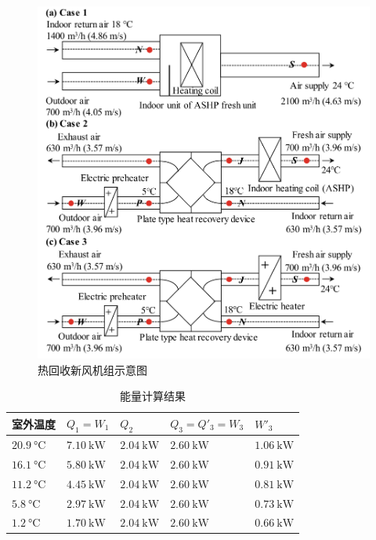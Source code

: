 \begin{figure}
	\centering
	\includegraphics[width=\textwidth]{figure/figure_11}
	\caption{热回收新风机组示意图}
	\label{F:11}
\end{figure}

\begin{table}[ht]
\centering	
\caption{能量计算结果}
\begin{tabular}{@{}lllll@{}}
	\toprule
	室外温度 & $Q_1 = W_1$ & $Q_2$ & $Q_3=Q'_3=W_3$ & $W'_3$ \\ \midrule
	$\qty{20.9}{\degreeCelsius} $ & $\qty{7.10}{\kW} $ & $\qty{2.04}{\kW} $ & $\qty{2.60}{\kW} $ & $\qty{1.06}{\kW} $ \\
	$\qty{16.1}{\degreeCelsius} $ & $\qty{5.80}{\kW} $ & $\qty{2.04}{\kW} $ & $\qty{2.60}{\kW} $ & $\qty{0.91}{\kW} $ \\
	$\qty{11.2}{\degreeCelsius} $ & $\qty{4.45}{\kW} $ & $\qty{2.04}{\kW} $ & $\qty{2.60}{\kW} $ & $\qty{0.81}{\kW} $ \\
	$\qty{5.8}{\degreeCelsius} $ & $\qty{2.97}{\kW} $ & $\qty{2.04}{\kW} $ & $\qty{2.60}{\kW} $ & $\qty{0.73}{\kW} $ \\
	$\qty{1.2}{\degreeCelsius} $ & $\qty{1.70}{\kW} $ & $\qty{2.04}{\kW} $ & $\qty{2.60}{\kW} $ & $\qty{0.66}{\kW} $ \\ \bottomrule
\end{tabular}
\label{T:3}
\end{table}

